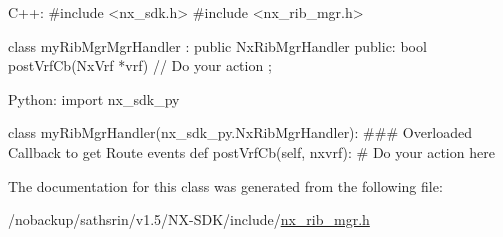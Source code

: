 \begin{DoxyCode}
  C++:
     #include <nx_sdk.h>
     #include <nx_rib_mgr.h>

     class myRibMgrMgrHandler : public NxRibMgrHandler {
        public:
           bool postVrfCb(NxVrf *vrf) {
                // Do your action
           }
     };

  Python:
     import nx_sdk_py

     class myRibMgrHandler(nx_sdk_py.NxRibMgrHandler):
     ### Overloaded Callback to get Route events
           def postVrfCb(self, nxvrf):
               # Do your action here
\end{DoxyCode}
 

The documentation for this class was generated from the following file:\begin{DoxyCompactItemize}
\item 
/nobackup/sathsrin/v1.5/NX-\/SDK/include/\hyperlink{nx__rib__mgr_8h}{nx\_\-rib\_\-mgr.h}\end{DoxyCompactItemize}
